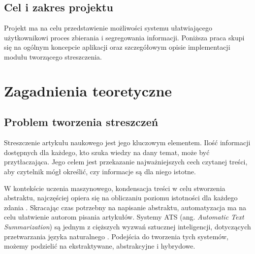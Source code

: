 \documentclass[12pt,a4paper,twoside]{article}
\begin{document}
\subsection*{Cel i zakres projektu}
Projekt ma na celu przedstawienie możliwości systemu ułatwiającego użytkownikowi proces zbierania i segregowania informacji. Poniższa praca skupi się na ogólnym koncepcie aplikacji oraz szczegółowym opisie implementacji modułu tworzącego streszczenia.
\newpage
\section{Zagadnienia teoretyczne}
\subsection{Problem tworzenia streszczeń}
Streszczenie artykułu naukowego jest jego kluczowym elementem. Ilość informacji dostępnych dla każdego, kto szuka wiedzy na dany temat, może być przytłaczająca. Jego celem jest przekazanie najważniejszych cech czytanej treści, aby czytelnik mógł określić, czy informacje są dla niego istotne. \par
W kontekście uczenia maszynowego, kondensacja treści w celu stworzenia abstraktu, najczęściej opiera się na obliczaniu poziomu istotności dla każdego zdania \cite{MUTLU2020102359}. Skracając czas potrzebny na napisanie abstraktu, automatyzacja ma na celu ułatwienie autorom pisania artykułów. Systemy ATS (ang. \textit{Automatic Text Summarization}) są jednym z cięższych wyzwań sztucznej inteligencji, dotyczących przetwarzania języka naturalnego \cite{ELKASSAS2021113679}. Podejścia do tworzenia tych systemów, możemy podzielić na ekstraktywane, abstrakcyjne i hybrydowe. 
\end{document}
